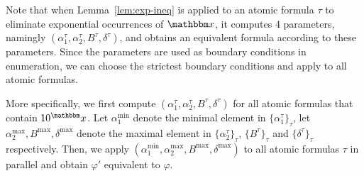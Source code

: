 Note that when Lemma~\ref{lem:exp-ineq} is applied to an atomic formula $\tau$ to eliminate exponential occurrences of $\ivarx$, it computes 4 parameters, namingly $(\alpha^\tau_1,\alpha^\tau_2,B^\tau,\delta^\tau)$, and obtains an equivalent {\pa} formula according to these parameters. Since the parameters are used as boundary conditions in enumeration, we can choose the strictest boundary conditions and apply to all atomic formulas.  

More specifically, we first compute $(\alpha^\tau_1,\alpha^\tau_2,B^\tau,\delta^\tau)$ 
for all atomic formulas that contain $10^\ivarx$. Let $\alpha^{\min}_1$ denote the minimal element in $\{\alpha^\tau_1\}_\tau$, let $\alpha^{\max}_2,B^{\max},\delta^{\max}$ denote the maximal element in $\{\alpha^\tau_2\}_\tau$, $\{B^\tau\}_\tau$ and $\{\delta^\tau\}_\tau$ respectively. Then, we apply $(\alpha^{\min}_1,\alpha^{\max}_2,B^{\max},\delta^{\max})$ to all atomic formulas $\tau$ in parallel and obtain $\varphi'$ equivalent to $\varphi$. 


